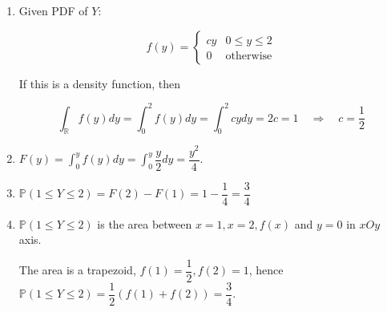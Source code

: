 \documentclass[12pt]{article}
\begin{document}
\begin{enumerate}
    \item Given PDF of $Y$:

          \begin{equation*}
              f(y)=\left\{\begin{array}{ll}
                  cy & 0\leqslant y\leqslant 2 \\
                  0  & \text{otherwise}
              \end{array}\right.
          \end{equation*}

          If this is a density function, then

          $$
              \int_\mathbb{R}f(y)dy=\int_0^2 f(y)dy=\int_0^2cydy=2c=1\quad\Rightarrow\quad c=\dfrac{1}{2}
          $$

    \item $\displaystyle F(y)=\int_0^y f(y)dy=\int_0^y\dfrac{y}{2}dy=\dfrac{y^2}{4}$.
    \item $\mathbb{P}(1\leqslant Y\leqslant 2)=F(2)-F(1)=1-\dfrac{1}{4}=\dfrac{3}{4}$
    \item $\mathbb{P}(1\leqslant Y\leqslant 2)$ is the area between $x=1,x=2,f(x)$ and $y=0$ in $xOy$ axis.

              {
                  \center
              }

          The area is a trapezoid, $f(1)=\dfrac{1}{2}, f(2)=1$, hence $\mathbb{P}(1\leqslant Y\leqslant 2)=\dfrac{1}{2}(f(1)+f(2))=\dfrac{3}{4}$.

\end{enumerate}
\end{document}
